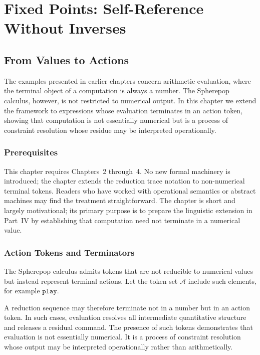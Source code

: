 \documentclass[12pt, oneside]{amsbook}
\theoremstyle{plain}
\theoremstyle{definition}
\theoremstyle{remark}
\begin{document}
\part{Fixed Points: Self-Reference Without Inverses}

\chapter{From Values to Actions}
\label{ch:actions}

The examples presented in earlier chapters concern arithmetic evaluation, where
the terminal object of a computation is always a number. The Spherepop calculus,
however, is not restricted to numerical output. In this chapter we extend the
framework to expressions whose evaluation terminates in an action token, showing
that computation is not essentially numerical but is a process of constraint
resolution whose residue may be interpreted operationally.

\section{Prerequisites}

This chapter requires Chapters~2 through~4. No new formal machinery is introduced; the chapter extends the reduction trace notation to non-numerical terminal tokens. Readers who have worked with operational semantics or abstract machines may find the treatment straightforward. The chapter is short and largely motivational; its primary purpose is to prepare the linguistic extension in Part~IV by establishing that computation need not terminate in a numerical value.

\section{Action Tokens and Terminators}
\label{sec:actions:tokens}

The Spherepop calculus admits tokens that are not reducible to numerical values
but instead represent terminal actions. Let the token set $\mathcal{A}$ include
such elements, for example $\texttt{play}$.

A reduction sequence may therefore terminate not in a number but in an action
token. In such cases, evaluation resolves all intermediate quantitative
structure and releases a residual command. The presence of such tokens
demonstrates that evaluation is not essentially numerical. It is a process of
constraint resolution whose output may be interpreted operationally rather than
arithmetically.
\end{document}
